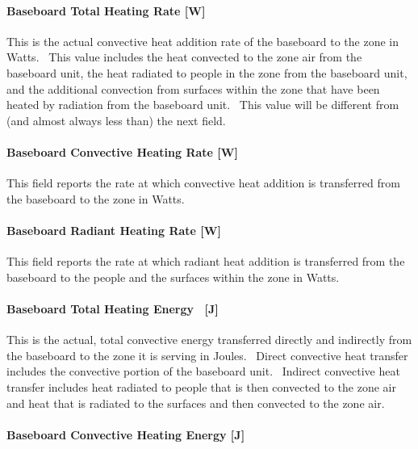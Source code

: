 \paragraph{Baseboard Total Heating Rate {[}W{]}}\label{baseboard-total-heating-rate-w-000}

This is the actual convective heat addition rate of the baseboard to the zone in Watts.~ This value includes the heat convected to the zone air from the baseboard unit, the heat radiated to people in the zone from the baseboard unit, and the additional convection from surfaces within the zone that have been heated by radiation from the baseboard unit.~ This value will be different from (and almost always less than) the next field.

\paragraph{Baseboard Convective Heating Rate {[}W{]}}\label{baseboard-convective-heating-rate-w-000}

This field reports the rate at which convective heat addition is transferred from the baseboard to the zone in Watts.

\paragraph{Baseboard Radiant Heating Rate {[}W{]}}\label{baseboard-radiant-heating-rate-w-000}

This field reports the rate at which radiant heat addition is transferred from the baseboard to the people and the surfaces within the zone in Watts.

\paragraph{Baseboard Total Heating Energy ~{[}J{]}}\label{baseboard-total-heating-energy-j-000}

This is the actual, total convective energy transferred directly and indirectly from the baseboard to the zone it is serving in Joules.~ Direct convective heat transfer includes the convective portion of the baseboard unit.~ Indirect convective heat transfer includes heat radiated to people that is then convected to the zone air and heat that is radiated to the surfaces and then convected to the zone air.

\paragraph{Baseboard Convective Heating Energy {[}J{]}}\label{baseboard-convective-heating-energy-j-000}

